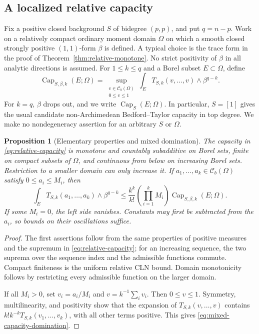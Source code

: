 \documentclass[11pt,a4paper]{article}
\numberwithin{equation}{section}
\newtheorem{proposition}[theorem]{Proposition}
\theoremstyle{definition}
\theoremstyle{remark}
\newcommand{\Cb}{\mathcal C_b}
\begin{document}
\subsection{A localized relative capacity}

Fix a positive closed background $S$ of bidegree $(p,p)$, and put
$q=n-p$. Work on a relatively compact ordinary moment domain $\Omega$
on which a smooth closed strongly positive $(1,1)$-form $\beta$ is
defined. A typical choice is the trace form in the proof of
Theorem~\ref{thm:relative-monotone}. No strict positivity of $\beta$
in all analytic directions is assumed. For $1\leq k\leq q$ and
a Borel subset $E\subset\Omega$, define
\begin{equation}
\label{eq:relative-capacity}
 \operatorname{Cap}_{S,\beta,k}(E;\Omega)
  =\sup_{\substack{v\in\Cb(\Omega)\\0\leq v\leq1}}
    \int_ET_{S,k}(v,\ldots,v)\wedge\beta^{q-k}.
\end{equation}
For $k=q$, $\beta$ drops out, and we write
$\operatorname{Cap}_S(E;\Omega)$. In particular, $S=[1]$ gives the
usual candidate non-Archimedean Bedford--Taylor capacity in top degree.
We make no nondegeneracy assertion for an arbitrary $S$ or $\Omega$.

\begin{proposition}[Elementary properties and mixed domination]
\label{prop:capacity-elementary}
The capacity in \eqref{eq:relative-capacity} is monotone and countably
subadditive on Borel sets, finite on compact subsets of $\Omega$, and
continuous from below on increasing Borel sets. Restriction to a
smaller domain can only increase it. If
$a_1,\ldots,a_k\in\Cb(\Omega)$ satisfy $0\leq a_i\leq M_i$, then
\begin{equation}
\label{eq:mixed-capacity-domination}
 \int_ET_{S,k}(a_1,\ldots,a_k)\wedge\beta^{q-k}
 \leq\frac{k^k}{k!}\left(\prod_{i=1}^kM_i\right)
       \operatorname{Cap}_{S,\beta,k}(E;\Omega).
\end{equation}
If some $M_i=0$, the left side vanishes. Constants may first be
subtracted from the $a_i$, so bounds on their oscillations suffice.
\end{proposition}

\begin{proof}
The first assertions follow from the same properties of positive
measures and the supremum in \eqref{eq:relative-capacity}; for an
increasing sequence, the two suprema over the sequence index and the
admissible functions commute. Compact finiteness is the uniform
relative CLN bound. Domain monotonicity follows by restricting every
admissible function on the larger domain.

If all $M_i>0$, set $v_i=a_i/M_i$ and
$v=k^{-1}\sum_i v_i$. Then $0\leq v\leq1$. Symmetry, multilinearity,
and positivity show that the expansion of
$T_{S,k}(v,\ldots,v)$ contains
$k!k^{-k}T_{S,k}(v_1,\ldots,v_k)$, with all other terms
positive. This gives \eqref{eq:mixed-capacity-domination}.
\end{proof}
\end{document}
